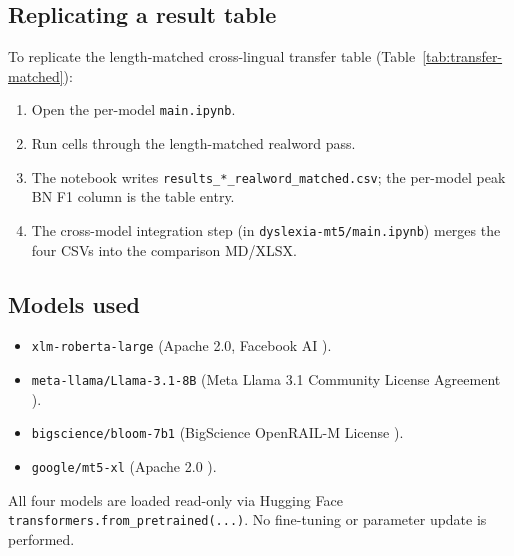 \subsection*{Replicating a result table}

To replicate the length-matched cross-lingual transfer table (Table~\ref{tab:transfer-matched}):
\begin{enumerate}
    \item Open the per-model \texttt{main.ipynb}.
    \item Run cells through the length-matched realword pass.
    \item The notebook writes \texttt{results\_*\_realword\_matched.csv}; the per-model peak BN F1 column is the table entry.
    \item The cross-model integration step (in \texttt{dyslexia-mt5/main.ipynb}) merges the four CSVs into the comparison MD/XLSX.
\end{enumerate}

\subsection*{Models used}

\begin{itemize}
    \item \texttt{xlm-roberta-large} (Apache 2.0, Facebook AI \cite{conneau2020xlmr}).
    \item \texttt{meta-llama/Llama-3.1-8B} (Meta Llama 3.1 Community License Agreement \cite{touvron2023llama}).
    \item \texttt{bigscience/bloom-7b1} (BigScience OpenRAIL-M License \cite{scao2022bloom}).
    \item \texttt{google/mt5-xl} (Apache 2.0 \cite{xue2021mt5}).
\end{itemize}

All four models are loaded read-only via Hugging Face \texttt{transformers.from\_pretrained(...)}. No fine-tuning or parameter update is performed.
